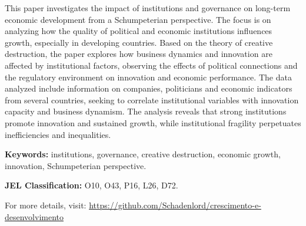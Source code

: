\documentclass[
	article,
	12pt,
	oneside,
	a4paper,
	english,
	brazil, %
	sumario=tradicional
]{abntex2}
\begin{document}
\frenchspacing

\maketitle
{}

	\begin{resumoumacoluna}
	\noindent
	This paper investigates the impact of institutions and governance on long-term economic development from a Schumpeterian perspective. The focus is on analyzing how the quality of political and economic institutions influences growth, especially in developing countries. Based on the theory of creative destruction, the paper explores how business dynamics and innovation are affected by institutional factors, observing the effects of political connections and the regulatory environment on innovation and economic performance. The data analyzed include information on companies, politicians and economic indicators from several countries, seeking to correlate institutional variables with innovation capacity and business dynamism. The analysis reveals that strong institutions promote innovation and sustained growth, while institutional fragility perpetuates inefficiencies and inequalities.
	
	\textbf{Keywords:} institutions, governance, creative destruction, economic growth, innovation, Schumpeterian perspective.
	
	\textbf{JEL Classification:} O10, O43, P16, L26, D72.

	For more details, visit: \url{https://github.com/Schadenlord/crescimento-e-desenvolvimento}

	\end{resumoumacoluna}

\newpage
\end{document}
